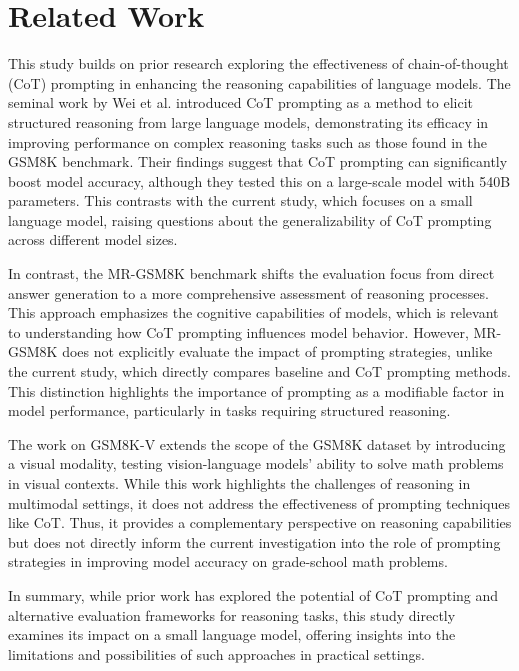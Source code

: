 \documentclass{article}
\begin{document}
\section*{Related Work}

This study builds on prior research exploring the effectiveness of chain-of-thought (CoT) prompting in enhancing the reasoning capabilities of language models. The seminal work by Wei et al. \cite{2201.11903v6} introduced CoT prompting as a method to elicit structured reasoning from large language models, demonstrating its efficacy in improving performance on complex reasoning tasks such as those found in the GSM8K benchmark. Their findings suggest that CoT prompting can significantly boost model accuracy, although they tested this on a large-scale model with 540B parameters. This contrasts with the current study, which focuses on a small language model, raising questions about the generalizability of CoT prompting across different model sizes.

In contrast, the MR-GSM8K benchmark \cite{2312.17080v4} shifts the evaluation focus from direct answer generation to a more comprehensive assessment of reasoning processes. This approach emphasizes the cognitive capabilities of models, which is relevant to understanding how CoT prompting influences model behavior. However, MR-GSM8K does not explicitly evaluate the impact of prompting strategies, unlike the current study, which directly compares baseline and CoT prompting methods. This distinction highlights the importance of prompting as a modifiable factor in model performance, particularly in tasks requiring structured reasoning.

The work on GSM8K-V \cite{2509.25160v3} extends the scope of the GSM8K dataset by introducing a visual modality, testing vision-language models' ability to solve math problems in visual contexts. While this work highlights the challenges of reasoning in multimodal settings, it does not address the effectiveness of prompting techniques like CoT. Thus, it provides a complementary perspective on reasoning capabilities but does not directly inform the current investigation into the role of prompting strategies in improving model accuracy on grade-school math problems.

In summary, while prior work has explored the potential of CoT prompting and alternative evaluation frameworks for reasoning tasks, this study directly examines its impact on a small language model, offering insights into the limitations and possibilities of such approaches in practical settings.
\end{document}
